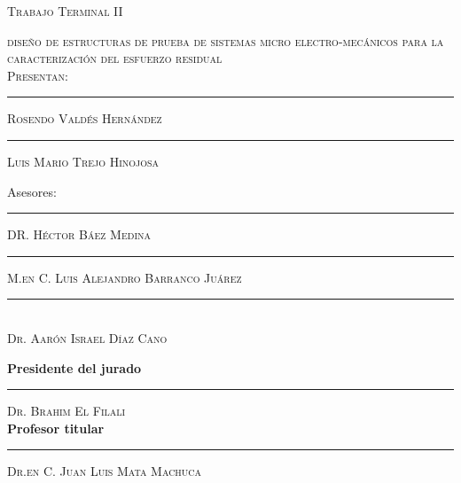 \begin{titlepage}
\begin{minipage}[c][0.81\textheight][t]{0.75\textwidth}
\begin{center}
      {
        {\large\scshape Trabajo Terminal II }
      }\\[0.4cm]

      \vspace{0.4cm}            

      \textsc{\LARGE diseño de estructuras de prueba de sistemas micro electro-mecánicos para la caracterización del esfuerzo residual }\\[.8cm]
      \textsc{\large Presentan:}\\[0.4cm]
      
      \begin{multicols}{2}
       \rule{50mm}{0.1mm}
       \textsc{ Rosendo Valdés Hernández}\\ %
       \rule{50mm}{0.1mm}
       \textsc{ Luis Mario Trejo Hinojosa }\\[0.3cm]  %
      \end{multicols}
     
      \vspace{0.5cm}
        {\large\scshape 
      
        {Asesores:}\\[0.3cm] 
        
        \begin{multicols}{2}
            \rule{50mm}{0.1mm}
            \textsc{ \normalsize DR. Héctor Báez Medina}\\[0.1cm] %
            \rule{50mm}{0.1mm}
            \textsc{ \normalsize M.en C. Luis Alejandro Barranco Juárez}\\  %
        \end{multicols}
        
            \rule{50mm}{0.1mm}\\
            \textsc{ \normalsize Dr. Aarón Israel Díaz Cano}
        }
      \vspace{0.5cm}
      
      \begin{multicols}{2}
            \textbf{Presidente del jurado}\\[0.8cm]
            \rule{50mm}{0.1mm}
            \textsc{ \normalsize \quad Dr. Brahim El Filali}\\[0.2cm] %
            
            \textbf{Profesor titular}\\[0.8cm]
            \rule{50mm}{0.1mm}
            \textsc{ \normalsize Dr.en C. Juan Luis Mata Machuca}\\  %
      \end{multicols}
      
    \end{center}
  \end{minipage}
\end{titlepage}
